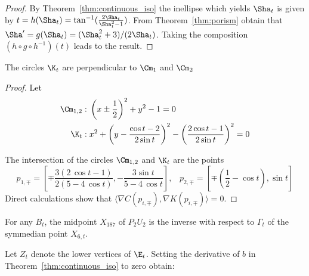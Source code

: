 \begin{proof}
  By Theorem~\ref{thm:continuous_iso}
  the inellipse which yields $\Sha_t$ is given by
    $t=h(\Sha_t)=\tan^{-1}(\frac{2\Sha_t}{\Sha_t^2-1})$.
    From Theorem~\ref{thm:porism} obtain that $\Sha'=g(\Sha_t)=(\Sha_t^2+3)/(2\Sha_t)$. Taking the composition
   $(h\circ g\circ h^{-1})(t)$ leads to the result.
 \end{proof}


\begin{proposition}
 The circles $\K_t$ are perpendicular to $\Cm_1$ and $\Cm_2$
\end{proposition}
\begin{proof} Let 
\begin{align*}
    \Cm_{1,2}:& \;\left(x\pm \frac{1}{2}\right)^2+y^2-1=0\\
    \K_t:&\;x^2+\left(y-\frac{\cos t-2}{2\sin t}\right)^2-\left(\frac{2\cos t-1}{ 2\sin t}\right)^2=0
\end{align*} 

 The intersection of the circles $\Cm_{1,2}$ and $\K_t$
 are the points
 \[
     p_{1,\mp}= \left[  \mp   {\frac {3(2\,\cos t -1)}{2( 5-4\,\cos
t )}},  - {\frac {3\sin t }{ 5-4\,\cos
 t }} \right],\;\;\;
p_{2,\mp}= \left[\mp (\frac{1}{2}-\cos t) , \sin t 
 \right]
\]
Direct calculations show that $\langle \nabla C (p_{i,\mp}),\nabla K(p_{i,\mp})\rangle=0$.
\end{proof}



\begin{remark}
For any $B_t$, the midpoint  $X_{187}$  of $P_2 U_2$ is the inverse with respect to $\Gamma_t$ of the symmedian point $X_{6,t}$.
\end{remark}

Let $Z_t$ denote the lower vertices of $\E_t$. Setting the derivative of $b$ in Theorem~\ref{thm:continuous_iso} to zero obtain:

